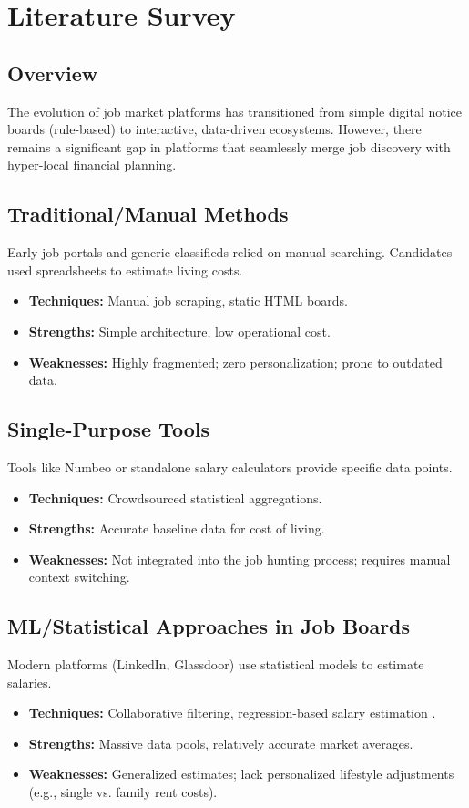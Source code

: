 \chapter{Literature Survey}

\section{Overview}
The evolution of job market platforms has transitioned from simple digital notice boards (rule-based) to interactive, data-driven ecosystems. However, there remains a significant gap in platforms that seamlessly merge job discovery with hyper-local financial planning.

\section{Traditional/Manual Methods}
Early job portals and generic classifieds relied on manual searching. Candidates used spreadsheets to estimate living costs.
\begin{itemize}
    \item \textbf{Techniques:} Manual job scraping, static HTML boards.
    \item \textbf{Strengths:} Simple architecture, low operational cost.
    \item \textbf{Weaknesses:} Highly fragmented; zero personalization; prone to outdated data.
\end{itemize}

\section{Single-Purpose Tools}
Tools like Numbeo \cite{numbeo} or standalone salary calculators provide specific data points.
\begin{itemize}
    \item \textbf{Techniques:} Crowdsourced statistical aggregations.
    \item \textbf{Strengths:} Accurate baseline data for cost of living.
    \item \textbf{Weaknesses:} Not integrated into the job hunting process; requires manual context switching.
\end{itemize}

\section{ML/Statistical Approaches in Job Boards}
Modern platforms (LinkedIn, Glassdoor) use statistical models to estimate salaries.
\begin{itemize}
    \item \textbf{Techniques:} Collaborative filtering, regression-based salary estimation \cite{salary_est}.
    \item \textbf{Strengths:} Massive data pools, relatively accurate market averages.
    \item \textbf{Weaknesses:} Generalized estimates; lack personalized lifestyle adjustments (e.g., single vs. family rent costs).
\end{itemize}

